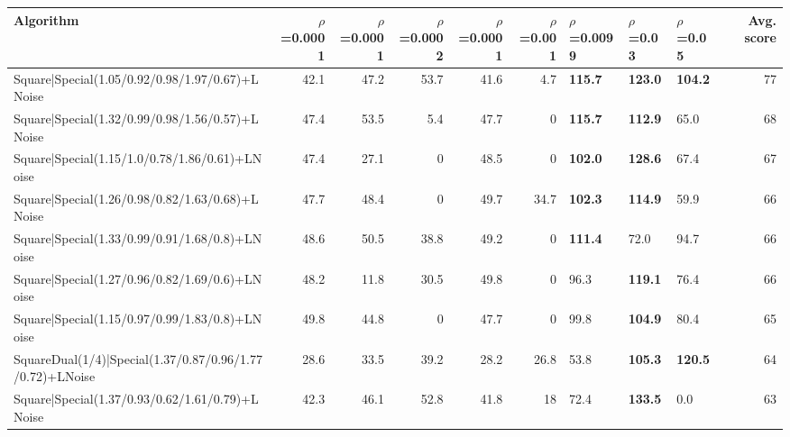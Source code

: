\begin{tabular}{lrrrrrlllr}
\hline
 Algorithm                                                       &   $\rho$=0.0001 &   $\rho$=0.0001 &   $\rho$=0.0002 &   $\rho$=0.0001 &   $\rho$=0.001 & $\rho$=0.0099   & $\rho$=0.03    & $\rho$=0.05    &   Avg. score \\
\hline
 Square|Special(1.05/0.92/0.98/1.97/0.67)+LNoise                 &            42.1 &            47.2 &            53.7 &            41.6 &            4.7 & \textbf{115.7}  & \textbf{123.0} & \textbf{104.2} &           77 \\
 Square|Special(1.32/0.99/0.98/1.56/0.57)+LNoise                 &            47.4 &            53.5 &             5.4 &            47.7 &            0   & \textbf{115.7}  & \textbf{112.9} & 65.0           &           68 \\
 Square|Special(1.15/1.0/0.78/1.86/0.61)+LNoise                  &            47.4 &            27.1 &             0   &            48.5 &            0   & \textbf{102.0}  & \textbf{128.6} & 67.4           &           67 \\
 Square|Special(1.26/0.98/0.82/1.63/0.68)+LNoise                 &            47.7 &            48.4 &             0   &            49.7 &           34.7 & \textbf{102.3}  & \textbf{114.9} & 59.9           &           66 \\
 Square|Special(1.33/0.99/0.91/1.68/0.8)+LNoise                  &            48.6 &            50.5 &            38.8 &            49.2 &            0   & \textbf{111.4}  & 72.0           & 94.7           &           66 \\
 Square|Special(1.27/0.96/0.82/1.69/0.6)+LNoise                  &            48.2 &            11.8 &            30.5 &            49.8 &            0   & 96.3            & \textbf{119.1} & 76.4           &           66 \\
 Square|Special(1.15/0.97/0.99/1.83/0.8)+LNoise                  &            49.8 &            44.8 &             0   &            47.7 &            0   & 99.8            & \textbf{104.9} & 80.4           &           65 \\
 SquareDual(1/4)|Special(1.37/0.87/0.96/1.77/0.72)+LNoise        &            28.6 &            33.5 &            39.2 &            28.2 &           26.8 & 53.8            & \textbf{105.3} & \textbf{120.5} &           64 \\
 Square|Special(1.37/0.93/0.62/1.61/0.79)+LNoise                 &            42.3 &            46.1 &            52.8 &            41.8 &           18   & 72.4            & \textbf{133.5} & 0.0            &           63 \\

\end{tabular}
